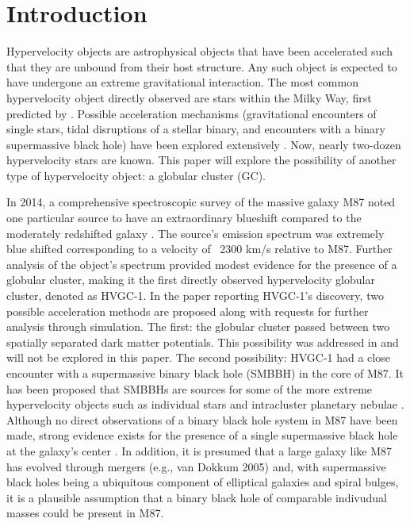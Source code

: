 \documentclass{aastex62}
\begin{document}
\section{Introduction} \label{sec:intro}
Hypervelocity objects are astrophysical objects that have been accelerated such that they are unbound from their host structure. Any such object is expected to have undergone an extreme gravitational interaction. The most common hypervelocity object directly observed are stars within the Milky Way, first predicted by \citet{hill88}.  Possible acceleration mechanisms (gravitational encounters of single stars, tidal disruptions of a stellar binary, and encounters with a binary supermassive black hole) have been explored extensively \citep{yutre03}. Now, nearly two-dozen hypervelocity stars are known. This paper will explore the possibility of another type of hypervelocity object: a globular cluster (GC). 

In 2014, a comprehensive spectroscopic survey of the massive galaxy M87 noted one particular source to have an extraordinary blueshift compared to the moderately redshifted galaxy \citep{cald14}. The source's emission spectrum was extremely blue shifted corresponding to a velocity of ~2300 km/s relative to M87. Further analysis of the object's spectrum provided modest evidence for the presence of a globular cluster, making it the first directly observed hypervelocity globular cluster, denoted as HVGC-1. In the paper reporting HVGC-1's discovery, two possible acceleration methods are proposed along with requests for further analysis through simulation. The first: the globular cluster passed between two spatially separated dark matter potentials. This possibility was addressed in \citet{sam15} and will not be explored in this paper. The second possibility: HVGC-1 had a close encounter with a supermassive binary black hole (SMBBH) in the core of M87. It has been proposed that SMBBHs are sources for some of the more extreme hypervelocity objects such as individual stars \citep{yutre03} and intracluster planetary nebulae \citep{hol05}. Although no direct observations of a binary black hole system in M87 have been made, strong evidence exists for the presence of a single supermassive black hole at the galaxy's center \citep{geb11}. In addition, it is presumed that a large galaxy like M87 has evolved through mergers (e.g., van Dokkum 2005) and, with supermassive black holes being a ubiquitous component of elliptical galaxies and spiral bulges, it is a plausible assumption that a binary black hole of comparable indivudual masses could be present in M87. 
\end{document}
